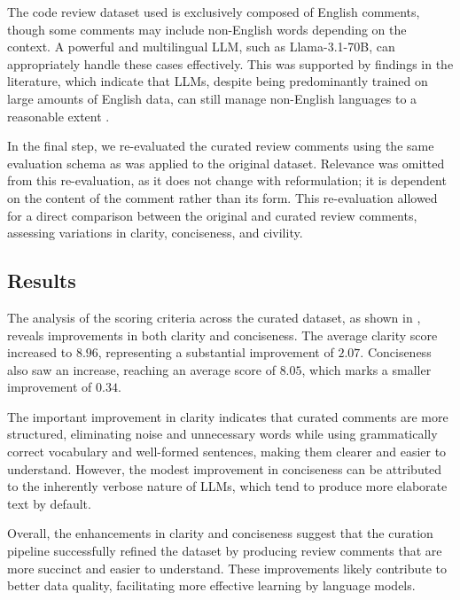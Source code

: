 The code review dataset used is exclusively composed of English comments, though some comments may include non-English words depending on the context. A powerful and multilingual LLM, such as Llama-3.1-70B, can appropriately handle these cases effectively. This was supported by findings in the literature, which indicate that LLMs, despite being predominantly trained on large amounts of English data, can still manage non-English languages to a reasonable extent \cite{terryn2024exploratory}. 


In the final step, we re-evaluated the curated review comments using the same evaluation schema as was applied to the original dataset. Relevance was omitted from this re-evaluation, as it does not change with reformulation; it is dependent on the content of the comment rather than its form. This re-evaluation allowed for a direct comparison between the original and curated review comments, assessing variations in clarity, conciseness, and civility.




\subsection{Results}

The analysis of the scoring criteria across the curated dataset, as shown in , reveals improvements in both clarity and conciseness. The average clarity score increased to $8.96$, representing a substantial improvement of $2.07$. Conciseness also saw an increase, reaching an average score of $8.05$, which marks a smaller improvement of $0.34$.

The important improvement in clarity indicates that curated comments are more structured, eliminating noise and unnecessary words while using grammatically correct vocabulary and well-formed sentences, making them clearer and easier to understand. However, the modest improvement in conciseness can be attributed to the inherently verbose nature of LLMs, which tend to produce more elaborate text by default.

Overall, the enhancements in clarity and conciseness suggest that the curation pipeline successfully refined the dataset by producing review comments that are more succinct and easier to understand. These improvements likely contribute to better data quality, facilitating more effective learning by language models.


